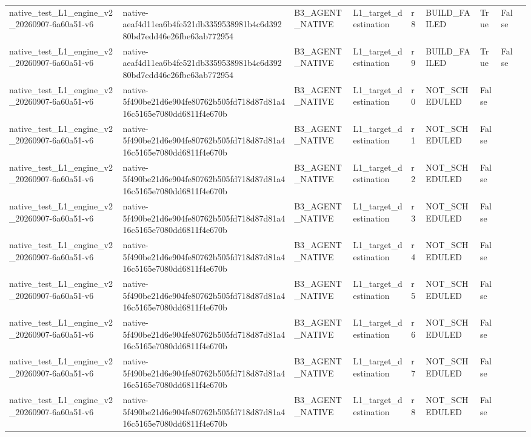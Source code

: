 \begin{tabular}{lllllllll}
native\_test\_L1\_engine\_v2\_20260907-6a60a51-v6 & native-aeaf4d11ea6b4fe521db3359538981b4c6d39280bd7edd46e26fbe63ab772954 & B3\_AGENT\_NATIVE & L1\_target\_destination & r8 & BUILD\_FAILED & True & False &  \\
native\_test\_L1\_engine\_v2\_20260907-6a60a51-v6 & native-aeaf4d11ea6b4fe521db3359538981b4c6d39280bd7edd46e26fbe63ab772954 & B3\_AGENT\_NATIVE & L1\_target\_destination & r9 & BUILD\_FAILED & True & False &  \\
native\_test\_L1\_engine\_v2\_20260907-6a60a51-v6 & native-5f490be21d6e904fe80762b505fd718d87d81a416c5165e7080dd6811f4e670b & B3\_AGENT\_NATIVE & L1\_target\_destination & r0 & NOT\_SCHEDULED & False &  &  \\
native\_test\_L1\_engine\_v2\_20260907-6a60a51-v6 & native-5f490be21d6e904fe80762b505fd718d87d81a416c5165e7080dd6811f4e670b & B3\_AGENT\_NATIVE & L1\_target\_destination & r1 & NOT\_SCHEDULED & False &  &  \\
native\_test\_L1\_engine\_v2\_20260907-6a60a51-v6 & native-5f490be21d6e904fe80762b505fd718d87d81a416c5165e7080dd6811f4e670b & B3\_AGENT\_NATIVE & L1\_target\_destination & r2 & NOT\_SCHEDULED & False &  &  \\
native\_test\_L1\_engine\_v2\_20260907-6a60a51-v6 & native-5f490be21d6e904fe80762b505fd718d87d81a416c5165e7080dd6811f4e670b & B3\_AGENT\_NATIVE & L1\_target\_destination & r3 & NOT\_SCHEDULED & False &  &  \\
native\_test\_L1\_engine\_v2\_20260907-6a60a51-v6 & native-5f490be21d6e904fe80762b505fd718d87d81a416c5165e7080dd6811f4e670b & B3\_AGENT\_NATIVE & L1\_target\_destination & r4 & NOT\_SCHEDULED & False &  &  \\
native\_test\_L1\_engine\_v2\_20260907-6a60a51-v6 & native-5f490be21d6e904fe80762b505fd718d87d81a416c5165e7080dd6811f4e670b & B3\_AGENT\_NATIVE & L1\_target\_destination & r5 & NOT\_SCHEDULED & False &  &  \\
native\_test\_L1\_engine\_v2\_20260907-6a60a51-v6 & native-5f490be21d6e904fe80762b505fd718d87d81a416c5165e7080dd6811f4e670b & B3\_AGENT\_NATIVE & L1\_target\_destination & r6 & NOT\_SCHEDULED & False &  &  \\
native\_test\_L1\_engine\_v2\_20260907-6a60a51-v6 & native-5f490be21d6e904fe80762b505fd718d87d81a416c5165e7080dd6811f4e670b & B3\_AGENT\_NATIVE & L1\_target\_destination & r7 & NOT\_SCHEDULED & False &  &  \\
native\_test\_L1\_engine\_v2\_20260907-6a60a51-v6 & native-5f490be21d6e904fe80762b505fd718d87d81a416c5165e7080dd6811f4e670b & B3\_AGENT\_NATIVE & L1\_target\_destination & r8 & NOT\_SCHEDULED & False &  &  \\

\end{tabular}
